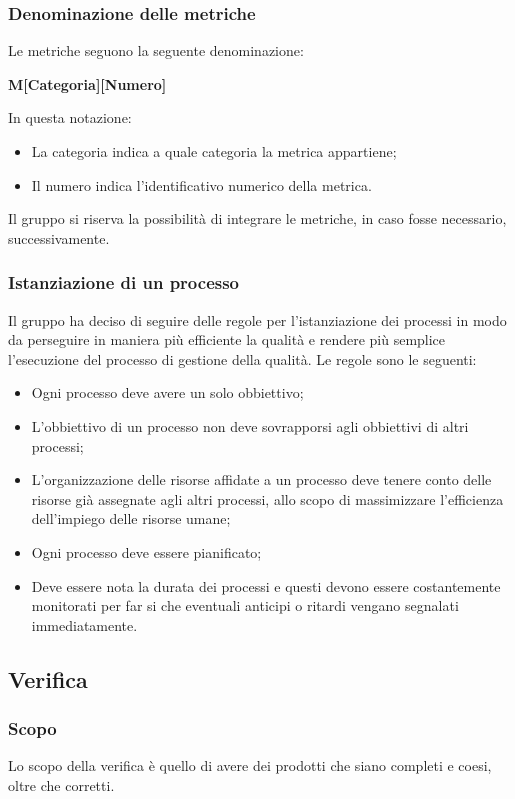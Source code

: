 \documentclass[../norme_di_progetto.tex]{subfiles}
\begin{document}
\subsubsection{Denominazione delle metriche}
Le metriche seguono la seguente denominazione:
\begin{center}
    \textbf{M[Categoria][Numero]}
\end{center}
In questa notazione:
\begin{itemize}
    \item La categoria indica a quale categoria la metrica appartiene;
    \item Il numero indica l'identificativo numerico della metrica.
\end{itemize}
Il gruppo si riserva la possibilità di integrare le metriche, in caso fosse necessario, successivamente.

\subsubsection{Istanziazione di un processo}
Il gruppo ha deciso di seguire delle regole per l'istanziazione dei processi in modo da perseguire in maniera più efficiente la qualità e rendere più semplice l'esecuzione del processo di gestione della qualità. Le regole sono le seguenti:
\begin{itemize}
    \item Ogni processo deve avere un solo obbiettivo;
    \item L'obbiettivo di un processo non deve sovrapporsi agli obbiettivi di altri processi;
    \item L'organizzazione delle risorse affidate a un processo deve tenere conto delle risorse già assegnate agli altri processi, allo scopo di massimizzare l'efficienza dell'impiego delle risorse umane;
    \item Ogni processo deve essere pianificato;
    \item Deve essere nota la durata dei processi e questi devono essere costantemente monitorati per far si che eventuali anticipi o ritardi vengano segnalati immediatamente.
\end{itemize}

\subsection{Verifica}

\subsubsection{Scopo}
Lo scopo della verifica è quello di avere dei prodotti che siano completi e coesi, oltre che corretti.
\end{document}

